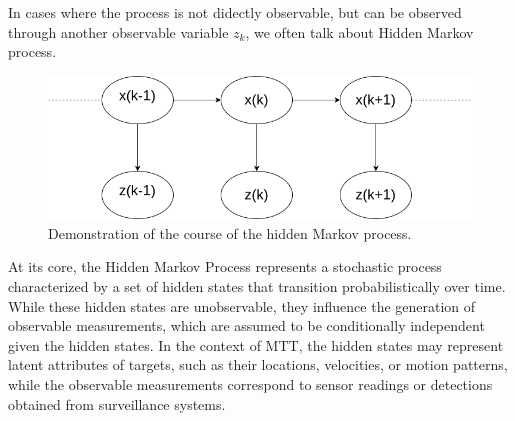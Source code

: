 In cases where the process is not didectly observable, but can be observed through another observable variable $z_k$,
we often talk about Hidden Markov process.
\begin{figure}[h]
    \centering
    \includegraphics[width=0.8\linewidth]{./text/chapter_01/imgs/HMM}
    \caption{Demonstration of the course of the hidden Markov process.}
    \label{fig:hmm}
\end{figure}

At its core, the Hidden Markov Process represents a stochastic process characterized by a set of hidden states that transition probabilistically over time. While these hidden states are unobservable, they influence the generation of observable measurements, which are assumed to be conditionally independent given the hidden states. In the context of MTT, the hidden states may represent latent attributes of targets, such as their locations, velocities, or motion patterns, while the observable measurements correspond to sensor readings or detections obtained from surveillance systems.

